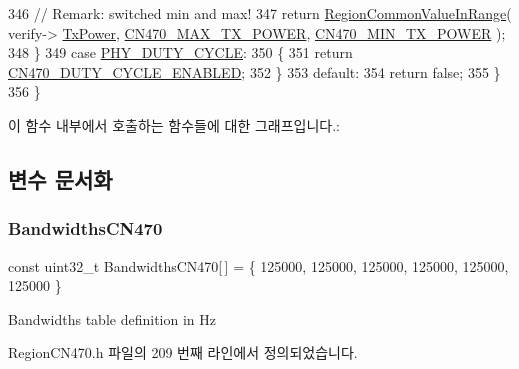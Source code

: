 \begin{DoxyCode}
346             \textcolor{comment}{// Remark: switched min and max!}
347             \textcolor{keywordflow}{return} \mbox{\hyperlink{group___r_e_g_i_o_n_c_o_m_m_o_n_gafdd1c80d953e18d755a631b72a9c3bd3}{RegionCommonValueInRange}}( verify->
      \mbox{\hyperlink{unionu_verify_params_a037b4f849fa8ed4aa1d3c58aef2b28ec}{TxPower}}, \mbox{\hyperlink{group___r_e_g_i_o_n_c_n470_gae977eb62cc9b2f49770b5f0d5ec1e5df}{CN470\_MAX\_TX\_POWER}}, \mbox{\hyperlink{group___r_e_g_i_o_n_c_n470_ga706088a08c37b56b67e88d8afa9a1db8}{CN470\_MIN\_TX\_POWER}} );
348         \}
349         \textcolor{keywordflow}{case} \mbox{\hyperlink{group___r_e_g_i_o_n_gga51cbe8f5433d914fe9cf81b451de2c2dac66308571e624ecc28c79ee0deab8cf0}{PHY\_DUTY\_CYCLE}}:
350         \{
351             \textcolor{keywordflow}{return} \mbox{\hyperlink{group___r_e_g_i_o_n_c_n470_ga02ff150057a51ba9fd56e9082a96bf0d}{CN470\_DUTY\_CYCLE\_ENABLED}};
352         \}
353         \textcolor{keywordflow}{default}:
354             \textcolor{keywordflow}{return} \textcolor{keyword}{false};
355     \}
356 \}
\end{DoxyCode}
이 함수 내부에서 호출하는 함수들에 대한 그래프입니다.\+:


\subsection{변수 문서화}
\mbox{\label{group___r_e_g_i_o_n_c_n470_gae2b304c90af11277c46253a9fc934b98}} 
\subsubsection{\texorpdfstring{Bandwidths\+C\+N470}{BandwidthsCN470}}
{\footnotesize\ttfamily const uint32\+\_\+t Bandwidths\+C\+N470\mbox{[}$\,$\mbox{]} = \{ 125000, 125000, 125000, 125000, 125000, 125000 \}\hspace{0.3cm}{\ttfamily [static]}}

Bandwidths table definition in Hz 

Region\+C\+N470.\+h 파일의 209 번째 라인에서 정의되었습니다.

\mbox{\label{group___r_e_g_i_o_n_c_n470_gad0ff6edccf59c2eaf0e6f35a46d62a05}} 
